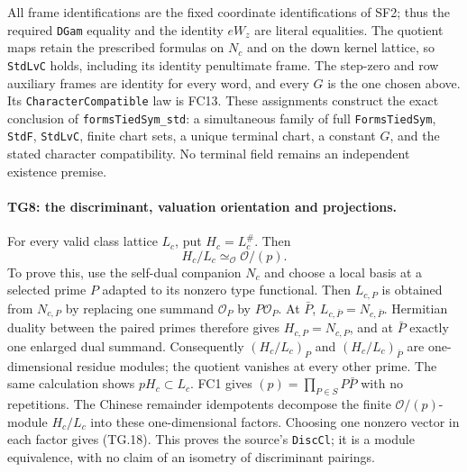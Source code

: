 \documentclass[11pt,a4paper]{article}
\numberwithin{equation}{section}
\theoremstyle{remark}\newtheorem{remark}[theorem]{Remark}
\begin{document}
All frame identifications are the fixed coordinate identifications
of SF2; thus the required \texttt{DGam} equality and the identity
$eW_z$ are literal equalities. The quotient maps retain the
prescribed formulas on $N_c$ and on the down kernel lattice,
so \texttt{StdLvC} holds, including its identity penultimate
frame. The step-zero and row auxiliary frames are identity for
every word, and every $G$ is the one chosen above. Its
\texttt{CharacterCompatible} law is FC13. These assignments
construct the exact conclusion of
\texttt{formsTiedSym\_\allowbreak std}: a simultaneous family of full
\texttt{FormsTiedSym}, \texttt{StdF}, \texttt{StdLvC}, finite
chart sets, a unique terminal chart, a constant $G$, and the
stated character compatibility. No terminal field remains an
independent existence premise.

\paragraph{TG8: the discriminant, valuation orientation and projections.}
For every valid class lattice $L_c$, put $H_c=L_c^{\#}$.
Then
\[
                     H_c/L_c\simeq_{\mathcal O}\mathcal O/(p).
 \tag{TG.18}
\]
To prove this, use the self-dual companion $N_c$ and choose a
local basis at a selected prime $P$ adapted to its nonzero type
functional. Then $L_{c,P}$ is obtained from $N_{c,P}$ by
replacing one summand $\mathcal O_P$ by $P\mathcal O_P$.
At $\bar P$, $L_{c,\bar P}=N_{c,\bar P}$. Hermitian duality
between the paired primes therefore gives
$H_{c,P}=N_{c,P}$, and at $\bar P$ exactly one enlarged dual
summand. Consequently $(H_c/L_c)_P$ and
$(H_c/L_c)_{\bar P}$ are one-dimensional residue modules;
the quotient vanishes at every other prime. The same calculation
shows $pH_c\subset L_c$. FC1 gives
$(p)=\prod_{P\in S}P\bar P$ with no repetitions. The Chinese
remainder idempotents decompose the finite $\mathcal O/(p)$-module
$H_c/L_c$ into these one-dimensional factors. Choosing one
nonzero vector in each factor gives (TG.18). This proves the
source's \texttt{DiscCl}; it is a module equivalence, with no
claim of an isometry of discriminant pairings.
\end{document}
